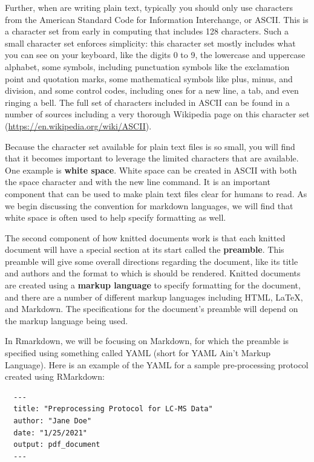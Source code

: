 \documentclass[]{tufte-book}
\begin{document}
Further, when are writing plain text, typically you should only use characters
from the American Standard Code for Information Interchange, or ASCII. This is a
character set from early in computing that includes 128 characters. Such a small
character set enforces simplicity: this character set mostly includes what you
can see on your keyboard, like the digits 0 to 9, the lowercase and uppercase
alphabet, some symbols, including punctuation symbols like the exclamation point
and quotation marks, some mathematical symbols like plus, minus, and division,
and some control codes, including ones for a new line, a tab, and even ringing a
bell. The full set of characters included in ASCII can be found in a number of
sources including a very thorough Wikipedia page on this character set (\url{https://en.wikipedia.org/wiki/ASCII}).

Because the character set available for plain text files is so small, you will
find that it becomes important to leverage the limited characters that are
available. One example is \textbf{white space}. White space can be created in ASCII
with both the space character and with the new line command. It is an important
component that can be used to make plain text files clear for humans to read. As
we begin discussing the convention for markdown languages, we will find that
white space is often used to help specify formatting as well.

The second component of how knitted documents work is that each knitted document
will have a special section at its start called the \textbf{preamble}. This preamble
will give some overall directions regarding the document, like its title and
authors and the format to which is should be rendered. Knitted documents are
created using a \textbf{markup language} to specify formatting for the document, and
there are a number of different markup languages including HTML, LaTeX, and
Markdown. The specifications for the document's preamble will depend on the
markup language being used.

In Rmarkdown, we will be focusing on Markdown, for which the preamble is
specified using something called YAML (short for YAML Ain't Markup Language).
Here is an example of the YAML for a sample pre-processing protocol created
using RMarkdown:

\begin{verbatim}
  ---
  title: "Preprocessing Protocol for LC-MS Data"
  author: "Jane Doe"
  date: "1/25/2021"
  output: pdf_document
  ---
\end{verbatim}
\end{document}

